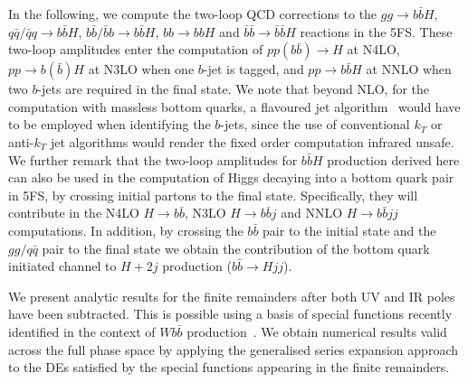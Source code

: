 \documentclass[main.tex]{subfiles}
\begin{document}
In the following, we compute the two-loop QCD corrections to the $gg \rightarrow b\bar{b}H$,
$q\bar{q}/\bar{q}q \rightarrow b\bar{b}H$, $b\bar{b}/\bar{b}b\rightarrow b\bar{b}H$, $bb \rightarrow
bbH$ and $\bar{b}\bar{b}\rightarrow\bar{b}\bar{b}H$ reactions in the 5FS. These two-loop amplitudes
enter the computation of $pp(b\bar{b})\to H$ at N4LO, $pp\to b(\bar{b})H$ at N3LO when one $b$-jet
is tagged, and $pp\to b\bar{b}H$ at NNLO when two $b$-jets are required in the final state.  We note
that beyond NLO, for the computation with massless bottom quarks, a flavoured jet
algorithm~\cite{Banfi:2006hf} would have to be employed when identifying the $b$-jets, since the use
of conventional $k_T$ or anti-$k_T$ jet algorithms would render the fixed order computation infrared
unsafe.  We further remark that the two-loop amplitudes for $b\bar{b}H$ production derived here can also be used in the computation of Higgs decaying into a bottom quark pair in 5FS, by
crossing initial partons to the final state. Specifically, they will contribute in the N4LO $H\to
b\bar{b}$, N3LO $H\to b\bar{b}j$ and NNLO $H\to b\bar{b}jj$ computations.  In addition, by crossing
the $b\bar{b}$ pair to the initial state and the $gg/q\bar{q}$ pair to the final state we obtain the
contribution of the bottom quark initiated channel to $H+2j$ production ($b\bar{b}\to Hjj$).

We present analytic results for the finite remainders after both UV and IR poles have been subtracted. This is possible using a basis of special functions recently identified in the context
of $Wb\bar{b}$ production~\cite{Badger:2021nhg}. We obtain numerical results valid across the full phase
space by applying the generalised series expansion approach~\cite{Francesco:2019yqt,Abreu:2020jxa,Hidding:2020ytt} to the DEs satisfied by the special functions appearing in the finite remainders.
\end{document}
